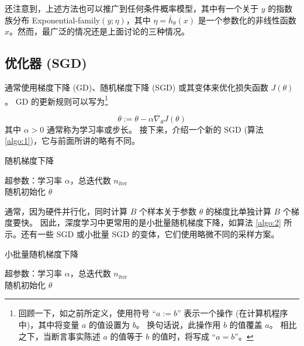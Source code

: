 还注意到，上述方法也可以推广到任何条件概率模型，其中有一个关于 $y$ 的指数族分布 Exponential-family$(y; \eta)$，其中 $\eta = \bar{h}_\theta(x)$ 是一个参数化的非线性函数 $x$。然而，最广泛的情况还是上面讨论的三种情况。

\subsection*{优化器 (SGD)}

通常使用梯度下降 (GD)、随机梯度下降 (SGD) 或其变体来优化损失函数 $J(\theta)$。 GD 的更新规则可以写为\footnote{回顾一下，如之前所定义，使用符号 “$a := b$” 表示一个操作 (在计算机程序中)，其中将变量 $a$ 的值设置为 $b$。 换句话说，此操作用 $b$ 的值覆盖 $a$。 相比之下，当断言事实陈述 $a$ 的值等于 $b$ 的值时，将写成 “$a = b$”。}

\begin{equation}
    \theta := \theta - \alpha \nabla_\theta J(\theta)
    \label{eq:7.8}
\end{equation}
其中 $\alpha > 0$ 通常称为学习率或步长。 接下来，介绍一个新的 SGD (算法 \ref{algo:1})，它与前面所讲的略有不同。

\vspace{0.5em}
\begin{algorithm}[H]
    \SetAlgoNoLine
    \label{algo:1}
    \caption{随机梯度下降}
    超参数：学习率 $\alpha$，总迭代数 $n_\text{iter}$\\
    随机初始化 $\theta$\\
\end{algorithm}

通常，因为硬件并行化，同时计算 $B$ 个样本关于参数 $\theta$ 的梯度比单独计算 $B$ 个梯度要快。 因此，深度学习中更常用的是小批量随机梯度下降，如算法 \ref{algo:2} 所示。还有一些 SGD 或小批量 SGD 的变体，它们使用略微不同的采样方案。

\vspace{0.5em}
\begin{algorithm}[H]
    \SetAlgoNoLine
    \label{algo:2}
    \caption{小批量随机梯度下降}
    超参数：学习率 $\alpha$，总迭代数 $n_\text{iter}$\\
    随机初始化 $\theta$\\
\end{algorithm}

